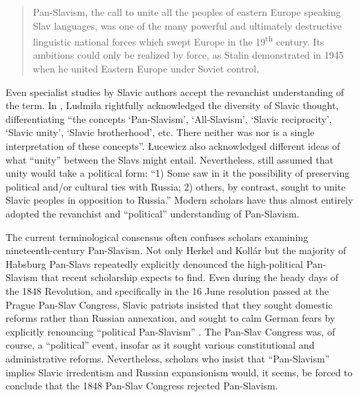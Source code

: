 \begin{quote}
    Pan-Slavism, the call to unite all the peoples of eastern Europe speaking Slav languages, was one of the many powerful and ultimately destructive linguistic national forces which swept Europe in the 19\textsuperscript{th} century. Its ambitions could only be realized by force, as Stalin demonstrated in 1945 when he united Eastern Europe under Soviet control. \citep[128]{cuellar_world_1999}
\end{quote}

\noindent Even specialist studies by Slavic authors accept the revanchist understanding of the term. In \citeyear{lucewicz_ideja_2015}, Ludmiła \citeauthor{lucewicz_ideja_2015} rightfully acknowledged the diversity of Slavic thought, differentiating “the concepts ‘Pan-Slavism’, ‘All-Slavism’, ‘Slavic reciprocity’, ‘Slavic unity’, ‘Slavic brotherhood’, etc. There neither was nor is a single interpretation of these concepts”. Łucewicz also acknowledged different ideas of what “unity” between the Slavs might entail. Nevertheless, \citet[69]{lucewicz_ideja_2015} still assumed that unity would take a political form: “1) Some saw in it the possibility of preserving political and/or cultural ties with Russia; 2) others, by contrast, sought to unite Slavic peoples in opposition to Russia.” Modern scholars have thus almost entirely adopted the revanchist and “political” understanding of Pan-Slavism.

The current terminological consensus often confuses scholars examining nine\-teenth-century Pan-Slavism. Not only Herkel and Kollár but the majority of Habsburg Pan-Slavs repeatedly explicitly denounced the high-political Pan-Slavism that recent scholarship expects to find. Even during the heady days of the 1848 Revolution, and specifically in the 16 June resolution passed at the Prague Pan-Slav Congress, Slavic patriots insisted that they sought domestic reforms rather than Russian annexation, and sought to calm German fears by explicitly renouncing “political Pan-Slavism” \citep[107]{moraczewski_manifest_1848}. The Pan-Slav Congress was, of course, a “political” event, insofar as it sought various constitutional and administrative reforms. Nevertheless, scholars who insist that “Pan-Slavism” implies Slavic irredentism and Russian expansionism would, it seems, be forced to conclude that the 1848 Pan-Slav Congress rejected Pan-Slavism.

